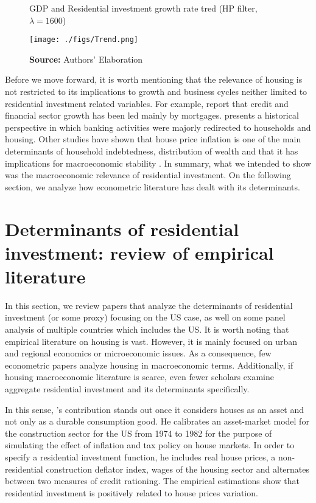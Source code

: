 \documentclass[12pt, a4paper]{article}
\begin{document}
\begin{figure}[H]
	\centering
	\caption{GDP and Residential investment growth rate tred (HP filter, $\lambda = 1600$)}
	\label{fig:trend}
	\texttt{[image: ./figs/Trend.png]}
	\caption*{\textbf{Source:} Authors' Elaboration}
\end{figure}


Before we move forward, it is worth mentioning that the relevance of housing is not restricted to its implications to growth and business cycles neither limited to residential investment related variables.
For example, \textcite{jorda_great_2016} report that credit and financial sector growth has been led mainly by mortgages. 
\textcite{kohl_more_2018} presents a historical perspective in which banking activities were majorly redirected to households and housing.
Other studies have shown that house price inflation is one of the main determinants of household indebtedness, distribution of wealth and that it has implications for macroeconomic stability \cites{ryoo_household_2015}{stockhammer_debt-driven_2016}{barnes_private_2016}{johnston_global_2017}{mian_household_2017}{anderson_politics_2020}{fuller_housing_2020}.
In summary, what we intended to show was the macroeconomic relevance of residential investment.
On the following section, we analyze how econometric literature has dealt with its determinants.
\section{Determinants of residential investment: review of empirical literature}
\label{sec:org5aced82}
\label{sec:empirical_review}
In this section, we review papers that analyze the determinants of residential investment (or some proxy) focusing on the US case, as well on some panel analysis of multiple countries which includes the US.
It is worth noting that empirical literature on housing is vast.
However, it is mainly focused on urban and regional economics or microeconomic issues.
As a consequence, few econometric papers analyze housing in macroeconomic terms.
Additionally, if housing macroeconomic literature is scarce, even fewer scholars examine aggregate residential investment and its determinants specifically.

In this sense, \citeauthor*{poterba_tax_1984}'s \citeyear{poterba_tax_1984} contribution stands out once it considers houses as an asset and not only as a durable consumption good.
He calibrates an asset-market model for the construction sector for the US from 1974 to 1982 for the purpose of simulating the effect of inflation and tax policy on house markets.
In order to specify a residential investment function, he includes real house prices, a non-residential construction deflator index, wages of the housing sector and alternates between two measures  of  credit  rationing.
The empirical estimations show that residential investment is positively related to house prices variation.
\end{document}
